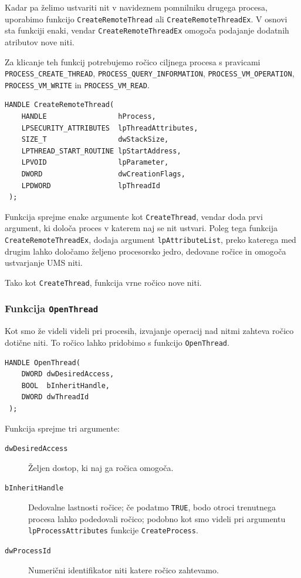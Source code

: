 \documentclass[a4paper,12pt,openright]{book}
\begin{document}
Kadar pa želimo ustvariti nit v navideznem pomnilniku drugega procesa, uporabimo funkcijo \texttt{CreateRemoteThread} ali \texttt{CreateRemoteThreadEx}.
V osnovi sta funkciji enaki, vendar \texttt{CreateRemoteThreadEx} omogoča podajanje dodatnih atributov nove niti.

Za klicanje teh funkcij potrebujemo ročico ciljnega procesa s pravicami \texttt{PROCESS\_CREATE\_THREAD}, \texttt{PROCESS\_QUERY\_INFORMATION}, \texttt{PROCESS\_VM\-\_OPERATION}, \texttt{PROCESS\_VM\_WRITE} in \texttt{PROCESS\_VM\_READ}.

\begin{lstlisting}[style=func]
 HANDLE CreateRemoteThread(
	HANDLE                 hProcess,
	LPSECURITY_ATTRIBUTES  lpThreadAttributes,
	SIZE_T                 dwStackSize,
	LPTHREAD_START_ROUTINE lpStartAddress,
	LPVOID                 lpParameter,
	DWORD                  dwCreationFlags,
	LPDWORD                lpThreadId
 );
\end{lstlisting}

Funkcija sprejme enake argumente kot \texttt{CreateThread}, vendar doda prvi argument, ki določa proces v katerem naj se nit ustvari.
Poleg tega funkcija \texttt{CreateRemoteThreadEx}, dodaja argument \texttt{lpAttributeList}, preko katerega med drugim lahko določamo željeno procesorsko jedro, dedovane ročice in omogoča ustvarjanje UMS niti.

Tako kot \texttt{CreateThread}, funkcija vrne ročico nove niti.

\subsubsection{Funkcija \texttt{OpenThread}}

Kot smo že videli videli pri procesih, izvajanje operacij nad nitmi zahteva ročico dotične niti.
To ročico lahko pridobimo s funkcijo \texttt{OpenThread}.

\begin{lstlisting}[style=func]
 HANDLE OpenThread(
	DWORD dwDesiredAccess,
	BOOL  bInheritHandle,
	DWORD dwThreadId
 );
\end{lstlisting}

Funkcija sprejme tri argumente:
\begin{description}
	\item[\texttt{dwDesiredAccess}] Željen dostop, ki naj ga ročica omogoča.
	\item[\texttt{bInheritHandle}] Dedovalne lastnosti ročice; če podatmo \texttt{TRUE}, bodo otroci trenutnega procesa lahko podedovali ročico; podobno kot smo videli pri argumentu \texttt{lpProcessAttributes} funkcije \texttt{CreateProcess}.
	\item[\texttt{dwProcessId}] Numerični identifikator niti katere ročico zahtevamo.
\end{description}
\end{document}
